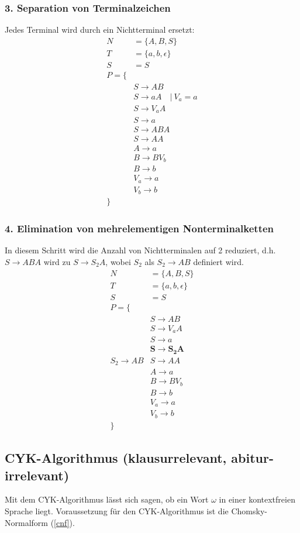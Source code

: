 \documentclass{article}
\newcommand{\ra}{\rightarrow}
\begin{document}
\subsubsection{3. Separation von Terminalzeichen}
Jedes Terminal wird durch ein Nichtterminal ersetzt:
\begin{align*}
    N&=\{A,B,S\}\\
    T&=\{a,b,\epsilon\}\\
    S&=S\\
    P=\{\\
    &S\ra AB\\
    &S\ra aA \quad |\ V_a = a\\
    &S\ra V_{a}A\\
    &S\ra a\\
    &S\ra ABA\\
    &S\ra AA\\
    &A\ra a\\
    &B\ra BV_b\\
    &B\ra b\\
    &V_a\ra a\\
    &V_b\ra b\\
    \}
\end{align*}
\subsubsection{4. Elimination von mehrelementigen Nonterminalketten}
In diesem Schritt wird die Anzahl von Nichtterminalen auf 2 reduziert, d.h. $S\ra ABA$ wird zu $S\ra S_2A$, wobei $S_2$ als $S_2\ra AB$ definiert wird.
\begin{align*}
    N&=\{A,B,S\}\\
    T&=\{a,b,\epsilon\}\\
    S&=S\\
    P=\{\\
    &S\ra AB\\
    &S\ra V_{a}A\\
    &S\ra a\\
    &\mathbf{S\ra S_2A}\\
    S_2\ra AB
    &S\ra AA\\
    &A\ra a\\
    &B\ra BV_b\\
    &B\ra b\\
    &V_a\ra a\\
    &V_b\ra b\\
    \}
\end{align*}
\subsection{CYK-Algorithmus (klausurrelevant, abitur-irrelevant)}
Mit dem CYK-Algorithmus lässt sich sagen, ob ein Wort $\omega$ in einer kontextfreien Sprache liegt. Voraussetzung für den CYK-Algorithmus ist die Chomsky-Normalform (\ref{cnf}).
\end{document}
